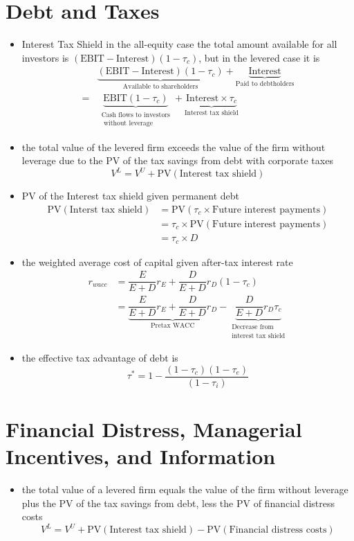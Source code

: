 \documentclass[a4paper,10pt]{extarticle}
\begin{document}
\clearpage

\section*{Debt and Taxes}
\begin{itemize}
    \item Interest Tax Shield in the all-equity case the total amount available for all investors is $(\mathrm{EBIT}-\mathrm{Interest})(1-\tau_c)$, but in the levered case it is
    \begin{align*}
    &\underbrace{(\mathrm{EBIT}-\mathrm{Interest})(1-\tau_c)}_{\text{Available to shareholders}}+ \underbrace{\mathrm{Interest}}_{\text{Paid to debtholders}}\\
    =&\,\underbrace{\mathrm{EBIT}(1-\tau_c)}_{\substack{\text{Cash flows to investors}\\\text{ without leverage}}}+\underbrace{\mathrm{Interest}\times\tau_c}_{\text{Interest tax shield}}
    \end{align*}
    
    \item the total value of the levered firm exceeds the value of the firm without leverage due to the PV of the tax savings from debt with corporate taxes
    \[V^L=V^U+\mathrm{PV}(\textrm{Interest tax shield})\]
    
    \item PV of the Interest tax shield given permanent debt
    \begin{align*}
        \mathrm{PV}(\text{Interst tax shield}) &= \text{PV}(\tau_c \times \text{Future interest payments})\\&=\tau_c\times\text{PV}(\text{Future interest payments})\\&=\tau_c \times D
    \end{align*}
    
    \item the weighted average cost of capital given after-tax interest rate
    \begin{align*}
        r_{wacc} &= \dfrac{E}{E+D}r_E+\dfrac{D}{E+D}r_D(1-\tau_c)\\&=\underbrace{\dfrac{E}{E+D}r_E+\dfrac{D}{E+D}r_D}_{\text{Pretax WACC}}-\underbrace{\dfrac{D}{E+D}r_D\tau_c}_{\substack{\text{Decrease from }\\ \text{interest tax shield}}}
    \end{align*}
    
    \item the effective tax advantage of debt is 
    \[\tau^{*}=1-\dfrac{(1-\tau_c)(1-\tau_e)}{(1-\tau_i)}\]
\end{itemize}
\section*{Financial Distress, Managerial Incentives, and Information}
\begin{itemize}
    \item the total value of a levered firm equals the value of the firm without leverage plus the PV of the tax savings from debt, less the PV of financial distress costs
    \[V^L=V^U+\text{PV}(\text{Interest tax shield})-\text{PV}(\text{Financial distress costs})\]
\end{itemize}
\end{document}
